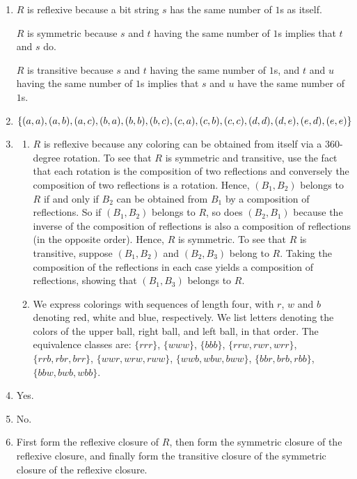 \documentclass{../../cls/sig-alternate-05-2015}
\begin{document}
\begin{enumerate}
\item $R$ is reflexive because a bit string $s$ has the same 
number of $1$s as itself. 

$R$ is symmetric because
$s$ and $t$ having the same number of $1$s implies that $t$ and $s$ do.

$R$ is transitive because $s$ and $t$ having the same number of $1$s,
and $t$ and $u$ having the same number of $1$s implies that $s$ and
$u$ have the same number of $1$s.

\item $\{(a, a), (a, b),
	(a, c), (b, a), (b, b), (b, c), (c, a),\\ (c, b), (c, c), (d, d), (d, e),
	(e, d), (e, e)\}$

\item 
\begin{enumerate}
	\item $R$ is
	reflexive because any coloring can be obtained from itself via
	a 360-degree rotation. To see that $R$ is symmetric and transitive,
	use the fact that each rotation is the composition of two reflections and conversely the composition of two reflections
	is a rotation. Hence, $(B_1, B_2)$ belongs to $R$ if and only
	if $B_2$ can be obtained from $B_1$ by a composition of reflections.
	So if $(B_1, B_2)$ belongs to $R$, so does $(B_2, B_1)$ because
	the inverse of the composition of reflections is also a composition
	of reflections (in the opposite order). Hence, $R$ is
	symmetric. To see that $R$ is transitive, suppose $(B_1, B_2)$ and
	$(B_2, B_3)$ belong to $R$. Taking the composition of the reflections
	in each case yields a composition of reflections, showing
	that $(B_1,B_3)$ belongs to $R$. 
	\item We express colorings with sequences
	of length four, with $r$, $w$ and $b$ denoting red, white and blue,
	respectively. We list letters denoting the colors of the upper
	ball, right ball, and left ball, in that order. The equivalence classes are: $\{rrr\}$, $\{www\}$, $\{bbb\}$, $\{rrw, rwr, wrr\}$, $\{rrb, rbr, brr\}$, $\{wwr, wrw, rww\}$, $\{wwb, wbw, bww\}$, $\{bbr, brb, rbb\}$, $\{bbw, bwb, wbb\}$.
\end{enumerate}

\item Yes.

\item No.

\item First form the reflexive closure of $R$, then form
the symmetric closure of the reflexive closure, and finally
form the transitive closure of the symmetric closure of the
reflexive closure.
\end{enumerate}
\end{document}
